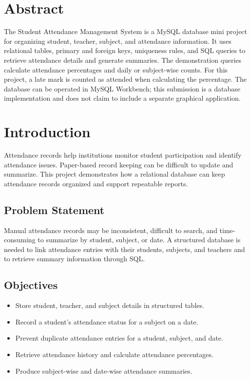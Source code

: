 \documentclass[12pt,a4paper]{report}
\begin{document}
\chapter*{Abstract}
The Student Attendance Management System is a MySQL database mini project for organizing student, teacher, subject, and attendance information. It uses relational tables, primary and foreign keys, uniqueness rules, and SQL queries to retrieve attendance details and generate summaries. The demonstration queries calculate attendance percentages and daily or subject-wise counts. For this project, a late mark is counted as attended when calculating the percentage. The database can be operated in MySQL Workbench; this submission is a database implementation and does not claim to include a separate graphical application.

\tableofcontents
\clearpage
{}

\chapter{Introduction}
Attendance records help institutions monitor student participation and identify attendance issues. Paper-based record keeping can be difficult to update and summarize. This project demonstrates how a relational database can keep attendance records organized and support repeatable reports.

\section{Problem Statement}
Manual attendance records may be inconsistent, difficult to search, and time-consuming to summarize by student, subject, or date. A structured database is needed to link attendance entries with their students, subjects, and teachers and to retrieve summary information through SQL.

\section{Objectives}
\begin{itemize}
    \item Store student, teacher, and subject details in structured tables.
    \item Record a student's attendance status for a subject on a date.
    \item Prevent duplicate attendance entries for a student, subject, and date.
    \item Retrieve attendance history and calculate attendance percentages.
    \item Produce subject-wise and date-wise attendance summaries.
\end{itemize}
\end{document}

